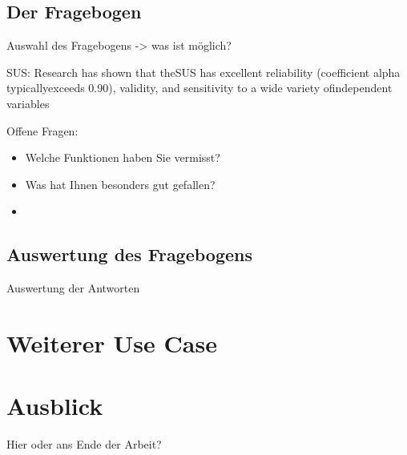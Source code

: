 \subsection{Der Fragebogen}
Auswahl des Fragebogens -> was ist möglich?

SUS: Research has shown that theSUS  has  excellent  reliability  (coefficient  alpha  typicallyexceeds 0.90), validity, and sensitivity to a wide variety ofindependent variables

Offene Fragen:
\begin{itemize}
\item Welche Funktionen haben Sie vermisst?
\item Was hat Ihnen besonders gut gefallen?
\item 
\end{itemize}

\subsection{Auswertung des Fragebogens}
Auswertung der Antworten

\section{Weiterer Use Case}

\section{Ausblick}
Hier oder ans Ende der Arbeit?